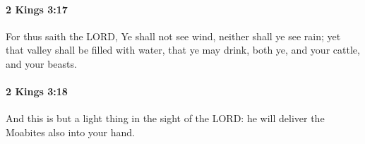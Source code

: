 		\paragraph{2 Kings 3:17} %
			\label{2KINGS-3-17}

			For thus saith the LORD, Ye shall not see wind, neither shall ye see rain; yet that valley shall be filled with water, that ye may drink, both ye, and your cattle, and your beasts.


		\paragraph{2 Kings 3:18} %
			\label{2KINGS-3-18}

			And this is but a light thing in the sight of the LORD: he will deliver the Moabites also into your hand.


